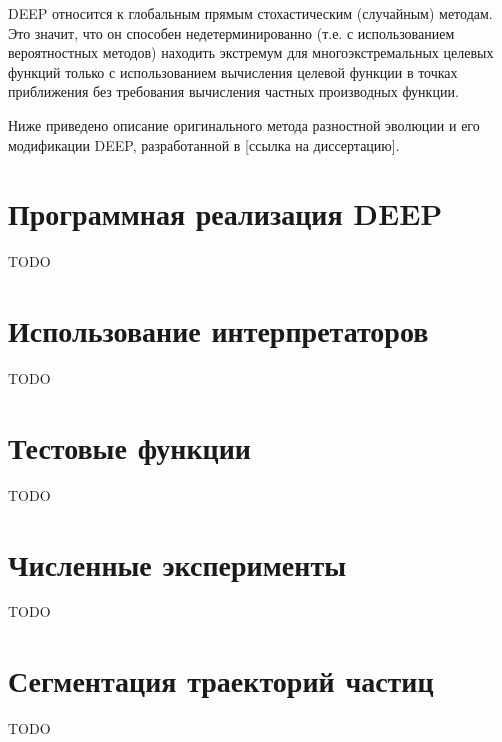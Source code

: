 DEEP относится к глобальным прямым стохастическим (случайным) методам.
Это значит, что он способен недетерминированно (т.е. с использованием вероятностных методов) находить экстремум для многоэкстремальных целевых функций только с использованием вычисления целевой функции в точках приближения без требования вычисления частных производных функции.

Ниже приведено описание оригинального метода разностной эволюции и его модификации DEEP, разработанной в [ссылка на диссертацию].

\section*{Программная реализация DEEP}
TODO

\section*{Использование интерпретаторов}
TODO

\section*{Тестовые функции}
TODO

\section*{Численные эксперименты}
TODO

\section*{Сегментация траекторий частиц}
TODO

